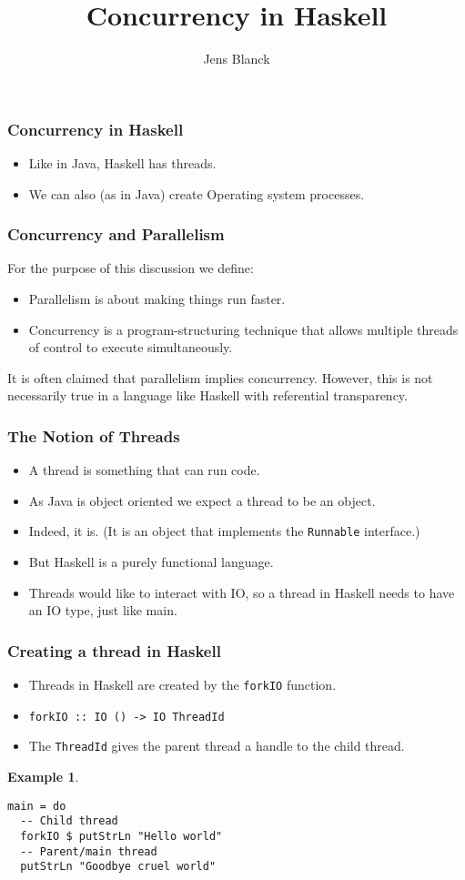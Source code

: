 \documentclass[notheorems]{beamer}%
\title%
{Concurrency in Haskell}
\author%
{Jens Blanck}
\institute%
{%
   Swansea University
}
\date%
{}
\theoremstyle{definition}
\newtheorem{example}[theorem]{Example}
\begin{document}
\begin{frame}
  \titlepage
\end{frame}

\begin{frame}
  \frametitle{Concurrency in Haskell}
  \begin{itemize}
  \item Like in Java, Haskell has \alert{threads}.
  \item We can also (as in Java) create Operating system processes.
  \end{itemize}
\end{frame}

\begin{frame}
  \frametitle{Concurrency and Parallelism}
  For the purpose of this discussion we define:
  \begin{itemize}
  \item Parallelism is about making things run faster.
  \item Concurrency is a program-structuring technique that allows multiple
    threads of control to execute simultaneously.
  \end{itemize}
  It is often claimed that parallelism implies concurrency. However, this is
  not necessarily true in a language like Haskell with referential transparency.
\end{frame}

\begin{frame}[fragile]
  \frametitle{The Notion of Threads}
  \begin{itemize}
  \item A thread is something that can run code.
  \item As Java is object oriented we expect a thread to be an \alert{object}.
  \item Indeed, it is. (It is an object that implements the \verb-Runnable-
    interface.)
  \item But Haskell is a \alert{purely} functional language.
  \item Threads would like to interact with IO, so a thread in
    Haskell needs to have an IO type, just like main.
  \end{itemize}
\end{frame}

\begin{frame}[fragile]
  \frametitle{Creating a thread in Haskell}
  \begin{itemize}
  \item Threads in Haskell are created by the \verb-forkIO- function.
  \item \verb+forkIO :: IO () -> IO ThreadId+
  \item The \verb-ThreadId- gives the parent thread a handle to the
    child thread.
  \end{itemize}
  \begin{example}
\begin{verbatim}
main = do
  -- Child thread
  forkIO $ putStrLn "Hello world"
  -- Parent/main thread
  putStrLn "Goodbye cruel world"
\end{verbatim}
  \end{example}
\end{frame}
\end{document}
